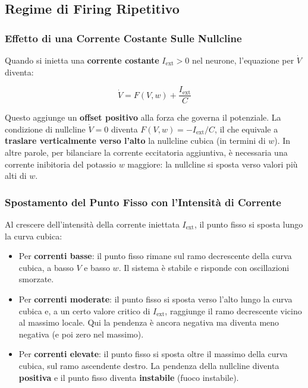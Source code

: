 \subsection{Regime di Firing Ripetitivo}

\subsubsection{Effetto di una Corrente Costante Sulle Nullcline}

Quando si inietta una \textbf{corrente costante} $I_{\text{ext}} > 0$ nel neurone, l'equazione per $\dot{V}$ diventa:

\begin{equation}
\dot{V} = F(V, w) + \frac{I_{\text{ext}}}{C}
\end{equation}

Questo aggiunge un \textbf{offset positivo} alla forza che governa il potenziale. La condizione di nullcline $\dot{V} = 0$ diventa $F(V, w) = -I_{\text{ext}}/C$, il che equivale a \textbf{traslare verticalmente verso l'alto} la nullcline cubica (in termini di $w$). In altre parole, per bilanciare la corrente eccitatoria aggiuntiva, è necessaria una corrente inibitoria del potassio $w$ maggiore: la nullcline si sposta verso valori più alti di $w$.

\subsubsection{Spostamento del Punto Fisso con l'Intensità di Corrente}

Al crescere dell'intensità della corrente iniettata $I_{\text{ext}}$, il punto fisso si sposta lungo la curva cubica:
\begin{itemize}
    \item Per \textbf{correnti basse}: il punto fisso rimane sul ramo decrescente della curva cubica, a basso $V$ e basso $w$. Il sistema è stabile e risponde con oscillazioni smorzate.
    \item Per \textbf{correnti moderate}: il punto fisso si sposta verso l'alto lungo la curva cubica e, a un certo valore critico di $I_{\text{ext}}$, raggiunge il ramo decrescente vicino al massimo locale. Qui la pendenza è ancora negativa ma diventa meno negativa (e poi zero nel massimo).
    \item Per \textbf{correnti elevate}: il punto fisso si sposta oltre il massimo della curva cubica, sul ramo ascendente destro. La pendenza della nullcline diventa \textbf{positiva} e il punto fisso diventa \textbf{instabile} (fuoco instabile).
\end{itemize}

